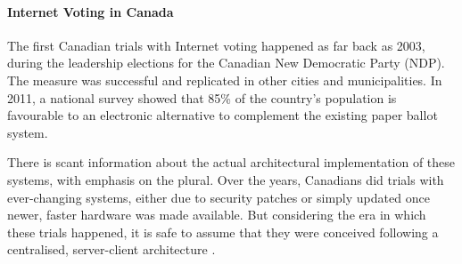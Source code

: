 \documentclass[../access.tex]{subfiles}
\begin{document}
    \paragraph{Internet Voting in Canada}
    The first Canadian trials with Internet voting happened as far back as 2003, during the leadership elections for the Canadian New Democratic Party (NDP). The measure was successful and replicated in other cities and municipalities. In 2011, a national survey showed that 85\% of the country's population is favourable to an electronic alternative to complement the existing paper ballot system.
    \par
    There is scant information about the actual architectural implementation of these systems, with emphasis on the plural. Over the years, Canadians did trials with ever-changing systems, either due to security patches or simply updated once newer, faster hardware was made available. But considering the era in which these trials happened, it is safe to assume that they were conceived following a centralised, server-client architecture \cite{Goodman2014}.
    
\end{document}
